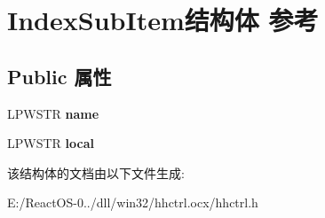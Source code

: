 \hypertarget{struct_index_sub_item}{}\section{Index\+Sub\+Item结构体 参考}
\label{struct_index_sub_item}
\subsection*{Public 属性}
\begin{DoxyCompactItemize}
\item 
\mbox{\label{struct_index_sub_item_ae1b69d8d577f285af804f02da4501dfa}} 
L\+P\+W\+S\+TR {\bfseries name}
\item 
\mbox{\label{struct_index_sub_item_a80471829c4f912364acc54e5ff142ab5}} 
L\+P\+W\+S\+TR {\bfseries local}
\end{DoxyCompactItemize}


该结构体的文档由以下文件生成\+:\begin{DoxyCompactItemize}
\item 
E\+:/\+React\+O\+S-\/0../dll/win32/hhctrl.\+ocx/hhctrl.\+h\end{DoxyCompactItemize}

